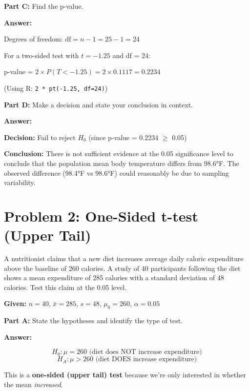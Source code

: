 \documentclass[11pt]{article}
\begin{document}
\vspace{6pt}

\textbf{Part C:} Find the p-value.

\textcolor{answergreen}{\textbf{Answer:}}

Degrees of freedom: $\text{df} = n - 1 = 25 - 1 = 24$

For a two-sided test with $t = -1.25$ and df = 24:

p-value = $2 \times P(T < -1.25) = 2 \times 0.1117 = 0.2234$

(Using R: \texttt{2 * pt(-1.25, df=24)})

\vspace{6pt}

\textbf{Part D:} Make a decision and state your conclusion in context.

\textcolor{answergreen}{\textbf{Answer:}}

\textbf{Decision:} Fail to reject $H_0$ (since p-value = 0.2234 $\geq$ 0.05)

\textbf{Conclusion:} There is not sufficient evidence at the 0.05 significance level to conclude that the population mean body temperature differs from 98.6°F. The observed difference (98.4°F vs 98.6°F) could reasonably be due to sampling variability.

\newpage

\section{Problem 2: One-Sided t-test (Upper Tail)}

A nutritionist claims that a new diet increases average daily caloric expenditure above the baseline of 260 calories. A study of 40 participants following the diet shows a mean expenditure of 285 calories with a standard deviation of 48 calories. Test this claim at the 0.05 level.

\textbf{Given:} $n = 40$, $\bar{x} = 285$, $s = 48$, $\mu_0 = 260$, $\alpha = 0.05$

\vspace{6pt}

\textbf{Part A:} State the hypotheses and identify the type of test.

\textcolor{answergreen}{\textbf{Answer:}}

$$H_0: \mu = 260 \text{ (diet does NOT increase expenditure)}$$
$$H_A: \mu > 260 \text{ (diet DOES increase expenditure)}$$

This is a \textbf{one-sided (upper tail) test} because we're only interested in whether the mean \textit{increased}.
\end{document}
